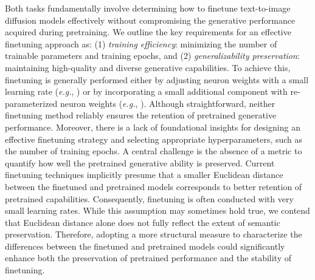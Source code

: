 Both tasks fundamentally involve determining how to finetune text-to-image diffusion models effectively without compromising the generative performance acquired during pretraining. We outline the key requirements for an effective finetuning approach as: (1) \emph{training efficiency}: minimizing the number of trainable parameters and training epochs, and (2) \emph{generalizability preservation}: maintaining high-quality and diverse generative capabilities. To achieve this, finetuning is generally performed either by adjusting neuron weights with a small learning rate (\emph{e.g.}, \cite{ruiz2023dreambooth}) or by incorporating a small additional component with re-parameterized neuron weights (\emph{e.g.}, \cite{hulora2022,zhang2023adding}). Although straightforward, neither finetuning method reliably ensures the retention of pretrained generative performance. Moreover, there is a lack of foundational insights for designing an effective finetuning strategy and selecting appropriate hyperparameters, such as the number of training epochs. A central challenge is the absence of a metric to quantify how well the pretrained generative ability is preserved. Current finetuning techniques implicitly presume that a smaller Euclidean distance between the finetuned and pretrained models corresponds to better retention of pretrained capabilities. Consequently, finetuning is often conducted with very small learning rates. While this assumption may sometimes hold true, we contend that Euclidean distance alone does not fully reflect the extent of semantic preservation. Therefore, adopting a more structural measure to characterize the differences between the finetuned and pretrained models could significantly enhance both the preservation of pretrained performance and the stability of finetuning.

